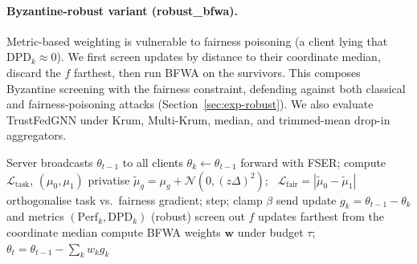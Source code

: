 \documentclass[pdflatex,sn-mathphys-num]{sn-jnl}
\theoremstyle{thmstyleone}%
\theoremstyle{thmstyletwo}%
\theoremstyle{thmstylethree}%
\newcommand{\dpd}{\mathrm{DPD}}
\begin{document}
\paragraph{Byzantine-robust variant (robust\_bfwa).}
Metric-based weighting is vulnerable to fairness poisoning (a client lying that
$\dpd_k\!\approx\!0$). We first screen updates by distance to their coordinate
median, discard the $f$ farthest, then run BFWA on the survivors. This composes
Byzantine screening with the fairness constraint, defending against both
classical and fairness-poisoning attacks (Section~\ref{sec:exp-robust}). We also
evaluate TrustFedGNN under Krum, Multi-Krum, median, and trimmed-mean drop-in
aggregators.

\begin{algorithm}[t]
\caption{TrustFedGNN (one communication round $t$)}
\label{alg:fedfairgnn}
\begin{algorithmic}[1]
\State Server broadcasts $\theta_{t-1}$ to all clients
  \State $\theta_k\gets\theta_{t-1}$
    \State forward with FSER; compute $\mathcal{L}_{\text{task}}$, $(\mu_0,\mu_1)$
    \State privatise $\tilde{\mu}_g=\mu_g+\mathcal{N}(0,(z\Delta)^2)$; \ $\mathcal{L}_{\text{fair}}=|\tilde{\mu}_0-\tilde{\mu}_1|$
    \State orthogonalise task vs.\ fairness gradient; step; clamp $\beta$
  \EndFor
  \State send update $g_k=\theta_{t-1}-\theta_k$ and metrics $(\mathrm{Perf}_k,\dpd_k)$
\EndFor
\State (robust) screen out $f$ updates farthest from the coordinate median
\State compute BFWA weights $\mathbf{w}$ under budget $\tau$; \ $\theta_t=\theta_{t-1}-\sum_k w_k g_k$
\end{algorithmic}
\end{algorithm}
\end{document}
